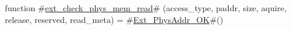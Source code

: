 function #\hyperref[sailRISCVzextzycheckzyphyszymemzyread]{ext\_check\_phys\_mem\_read}# (access_type, paddr, size, aquire, release, reserved, read_meta) =
  #\hyperref[sailRISCVzExtzyPhysAddrzyOK]{Ext\_PhysAddr\_OK}#()
